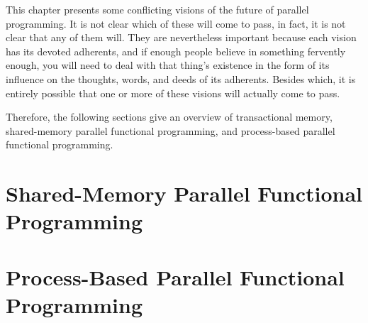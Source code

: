 

This chapter presents some conflicting visions of the future of parallel
programming.
It is not clear which of these will come to pass, in fact, it is not
clear that any of them will.
They are nevertheless important because each vision has its devoted
adherents, and if enough people believe in something fervently enough,
you will need to deal with that thing's existence in the form of its
influence on the thoughts, words, and deeds of its adherents.
Besides which, it is entirely possible that one or more of these visions
will actually come to pass.

Therefore, the following sections give an overview of transactional
memory, shared-memory parallel functional programming, and
process-based parallel functional programming.



\section{Shared-Memory Parallel Functional Programming}
\label{sec:future:Shared-Memory Parallel Functional Programming}

\section{Process-Based Parallel Functional Programming}
\label{sec:future:Process-Based Parallel Functional Programming}

